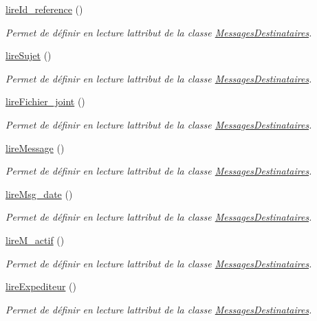 \begin{DoxyCompactItemize}
\hyperlink{class_messages_destinataires_a023cadca1a1a12c6e0f3e4b7e5d0db08}{lire\+Id\+\_\+reference} ()
\begin{DoxyCompactList}\small\item\em Permet de définir en lecture l\textquotesingle{}attribut de la classe \hyperlink{class_messages_destinataires}{Messages\+Destinataires}. \end{DoxyCompactList}\item 
\hyperlink{class_messages_destinataires_a0a7e2a3bd0e884f19c150095141dccb0}{lire\+Sujet} ()
\begin{DoxyCompactList}\small\item\em Permet de définir en lecture l\textquotesingle{}attribut de la classe \hyperlink{class_messages_destinataires}{Messages\+Destinataires}. \end{DoxyCompactList}\item 
\hyperlink{class_messages_destinataires_ae0fed10b7898e856eefdeb2748a8182b}{lire\+Fichier\+\_\+joint} ()
\begin{DoxyCompactList}\small\item\em Permet de définir en lecture l\textquotesingle{}attribut de la classe \hyperlink{class_messages_destinataires}{Messages\+Destinataires}. \end{DoxyCompactList}\item 
\hyperlink{class_messages_destinataires_afcc38aa5611e45d02c271c56bf866a46}{lire\+Message} ()
\begin{DoxyCompactList}\small\item\em Permet de définir en lecture l\textquotesingle{}attribut de la classe \hyperlink{class_messages_destinataires}{Messages\+Destinataires}. \end{DoxyCompactList}\item 
\hyperlink{class_messages_destinataires_a196017b65c12938cc763c8e08df8b1dd}{lire\+Msg\+\_\+date} ()
\begin{DoxyCompactList}\small\item\em Permet de définir en lecture l\textquotesingle{}attribut de la classe \hyperlink{class_messages_destinataires}{Messages\+Destinataires}. \end{DoxyCompactList}\item 
\hyperlink{class_messages_destinataires_a9835a1106bc78c6b24e6007d6537f03f}{lire\+M\+\_\+actif} ()
\begin{DoxyCompactList}\small\item\em Permet de définir en lecture l\textquotesingle{}attribut de la classe \hyperlink{class_messages_destinataires}{Messages\+Destinataires}. \end{DoxyCompactList}\item 
\hyperlink{class_messages_destinataires_ab1b37cffce0bcc420712e92d0e8540c3}{lire\+Expediteur} ()
\begin{DoxyCompactList}\small\item\em Permet de définir en lecture l\textquotesingle{}attribut de la classe \hyperlink{class_messages_destinataires}{Messages\+Destinataires}. \end{DoxyCompactList}\end{DoxyCompactItemize}


